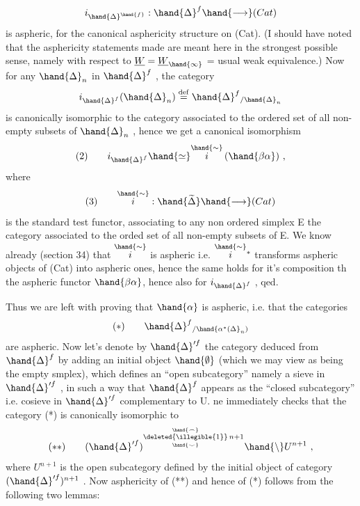 \[ i_{\hand{\Delta}^{\hand{f}}} : \hand{\Delta}^f \hand{\longrightarrow} (Cat) \]
is aspheric,  for the canonical asphericity structure on (Cat).  (I
should have noted that the asphericity statements made are meant here
in the strongest possible sense,  namely with respect to $\underline{W} = \underline{W}_{\hand{\infty}}$ = usual
weak equivalence.)  Now for any $\hand{\Delta}_n$ in $\hand{\Delta}^f$ ,  the category
\[ i_{\hand{\Delta}^f}(\hand{\Delta}_n) \overset{\mathrm{def}}{=} \hand{\Delta}^f{}_{/\hand{\Delta}_n} \]
is canonically isomorphic to the category associated to the ordered set
of all non-empty subsets of $\hand{\Delta}_n$ ,  hence we get a canonical isomorphism
\[ (2) \qquad i_{\hand{\Delta}^f} \hand{\simeq} \overset{\hand{\sim}}{i}\,(\hand{\beta\alpha}) \ , \]
where
\[ (3) \qquad \overset{\hand{\sim}}{i} : \hand{\widetilde{\Delta}} \hand{\longrightarrow} (Cat) \]
is the standard test functor,  associating to any non ordered simplex
E the category associated to the orded set of all non-empty subsets
of E.  We know already (section 34) that $\overset{\hand{\sim}}{i}$ is aspheric  i.e.
$\overset{\hand{\sim}}{i}{}^{*}$ transforms aspheric objects of (Cat) into aspheric ones,  hence the
same holds for it's composition th the aspheric functor $\hand{\beta\alpha}$, hence
also for $i_{\hand{\Delta}^f}$ ,  qed.

Thus we are left with proving that $\hand{\alpha}$ is aspheric,  i.e. that the
categories
\[ (*) \qquad \hand{\Delta}^f{}_{/\hand{\alpha^*(\Delta}_n)} \]
are aspheric.  Now let's denote by $\hand{\Delta}'^f$ the category deduced from $\hand{\Delta}^f$
by adding an initial object $\hand{\emptyset}$ (which we may view as being the empty
smplex),   which defines an ``open subcategory''  namely a
sieve in $\hand{\Delta}'^f$ ,   in such a way that $\hand{\Delta}^f$ appears as
the ``closed subcategory'' i.e. cosieve in $\hand{\Delta}'^f$ complementary to U.  ne
immediately checks that the category (*) is canonically isomorphic to
\[ (**) \qquad (\hand{\Delta}'^f)^{\overset{\hand{\frown}}{\underset{\hand{\smile}}{\deleted{\illegible{1}}}}\, n+1} \hand{\setminus} U^{n+1} \ , \]
where $U^{n+1}$ is the open subcategory defined by the initial object of
  category $(\hand{\Delta}'^f)^{n+1}$ .  Now asphericity of (**) and hence
of (*) follows from the following two lemmas:

